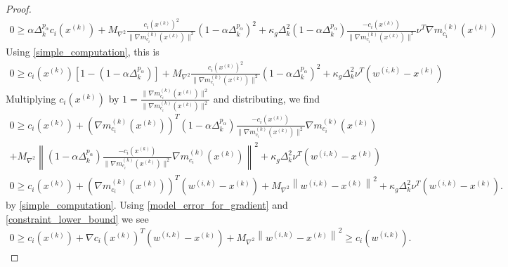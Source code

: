 \documentclass{article}
\theoremstyle{case}
\numberwithin{theorem}{subsection}
\newcommand{\dk}{\Delta_k}
\newcommand{\gmcik}{{\nabla m_{c_i}^{(k)}\left(\xk\right)}}
\newcommand{\maxhessian}{{M_{\nabla^2}}}
\newcommand{\wik}{{w^{(i, k)}}}
\newcommand{\xk}{{x^{(k)}}}
\begin{document}
\begin{proof}
\begin{align*}
0\ge \alpha \dk^{p_{\alpha}} c_i(\xk) + \maxhessian \frac {c_i(\xk)^2}{\|\gmcik\|^2}\left(1 - \alpha \dk^{p_{\alpha}}\right)^2 + \kappa_g \dk^2 \left(1 - \alpha \dk^{p_{\alpha}}\right)\frac{-c_i(\xk)}{\|\gmcik\|^2}\nu^T\gmcik
\end{align*}
Using \cref{simple_computation}, this is
\begin{align*}
0 \ge c_i(\xk)\left[1 - \left(1 - \alpha \dk^{p_{\alpha}}\right)\right] + \maxhessian \frac {c_i(\xk)^2}{\|\gmcik\|^2}\left(1 - \alpha \dk^{p_{\alpha}}\right)^2 + \kappa_g \dk^2\nu^T \left(\wik - \xk\right)
\end{align*}
Multiplying $c_i(\xk)$ by $1 = \frac{\|\gmcik\|^2}{\|\gmcik\|^2}$ and distributing, we find
\begin{align*}
0 \ge c_i(\xk) + \left(\gmcik\right)^T\left(1 - \alpha \dk^{p_{\alpha}}\right)\frac{-c_i(\xk)}{\|\gmcik\|^2}\gmcik  \\
+ \maxhessian \left\|\left(1 - \alpha \dk^{p_{\alpha}}\right)\frac{-c_i(\xk)}{\|\gmcik\|^2}\gmcik\right\|^2
+ \kappa_g \dk^2\nu^T \left(\wik - \xk\right) \\
0 \ge c_i(\xk) + \left(\gmcik\right)^T\left(\wik - \xk\right)+ \maxhessian \left\|\wik - \xk\right\|^2  + \kappa_g \dk^2\nu^T \left(\wik - \xk\right).
\end{align*}
by \cref{simple_computation}.
Using \cref{model_error_for_gradient} and \cref{constraint_lower_bound} we see
\begin{align}
0 \ge c_i(\xk) + \nabla c_i(\xk)^T\left(\wik - \xk \right) + \maxhessian \left\|\wik - \xk\right\|^2 \ge c_i(\wik). \label{c_is_negative}
\end{align}


\end{proof}
\end{document}
